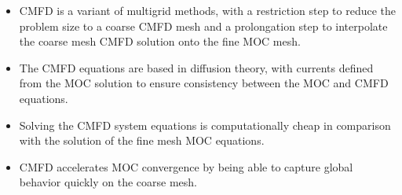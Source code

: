 \newpage
\vfill
\begin{highlightsbox}[frametitle=Highlights]
	\begin{itemize}
		\item \ac{CMFD} is a variant of multigrid methods, with a restriction step to reduce the problem size to a coarse \ac{CMFD} mesh and a prolongation step to interpolate the coarse mesh \ac{CMFD} solution onto the fine \ac{MOC} mesh.
		\item The \ac{CMFD} equations are based in diffusion theory, with currents defined from the \ac{MOC} solution to ensure consistency between the \ac{MOC} and \ac{CMFD} equations.
		\item Solving the \ac{CMFD} system equations is computationally cheap in comparison with the solution of the fine mesh \ac{MOC} equations.
		\item \ac{CMFD} accelerates \ac{MOC} convergence by being able to capture global behavior quickly on the coarse mesh.
	\end{itemize}
\end{highlightsbox}
\vfill